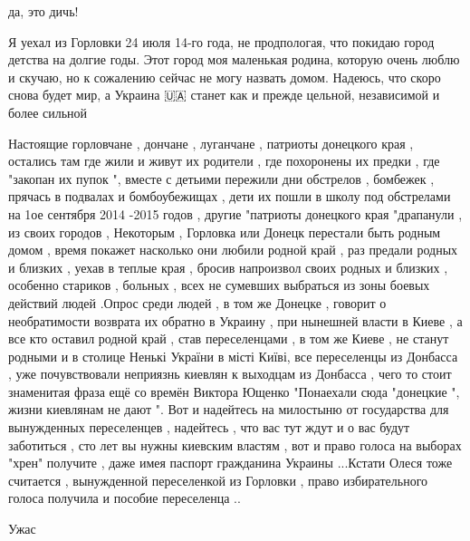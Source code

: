\begin{itemize}
да, это дичь!

 

Я уехал из Горловки 24 июля 14-го года, не продпологая, что покидаю город
детства на долгие годы. Этот город моя маленькая родина, которую очень люблю и
скучаю, но к сожалению сейчас не могу назвать домом. Надеюсь, что скоро снова
будет мир, а Украина 🇺🇦 станет как и прежде цельной, независимой и более
сильной


 

Настоящие горловчане , дончане , луганчане , патриоты донецкого края , остались
там где жили и живут их родители , где похоронены их предки , где "закопан их
пупок ", вместе с детьими пережили дни обстрелов , бомбежек , прячась в
подвалах и бомбоубежищах , дети их пошли в школу под обстрелами на 1ое сентября
2014 -2015 годов , другие "патриоты донецкого края "драпанули , из своих
городов , Некоторым , Горловка или Донецк перестали быть родным домом , время
покажет насколько они любили родной край , раз предали родных и близких , уехав
в теплые края , бросив напроизвол своих родных и близких , особенно стариков ,
больных , всех не сумевших выбраться из зоны боевых действий людей .Опрос среди
людей , в том же Донецке , говорит о необратимости возврата их обратно в
Украину , при нынешней власти в Киеве , а все кто оставил родной край , став
переселенцами , в том же Киеве , не станут родными и в столице Ненькі України в
місті Київі, все переселенцы из Донбасса , уже почувствовали неприязнь киевлян
к выходцам из Донбасса , чего то стоит знаменитая фраза ещё со времён Виктора
Ющенко "Понаехали сюда "донецкие ", жизни киевлянам не дают ". Вот и надейтесь
на милостыню от государства для вынужденных переселенцев , надейтесь , что вас
тут ждут и о вас будут заботиться , сто лет вы нужны киевским властям , вот и
право голоса на выборах "хрен" получите , даже имея паспорт гражданина Украины
...Кстати Олеся тоже считается , вынужденной переселенкой из Горловки , право
избирательного голоса получила и пособие переселенца ..

 
Ужас

\end{itemize}

